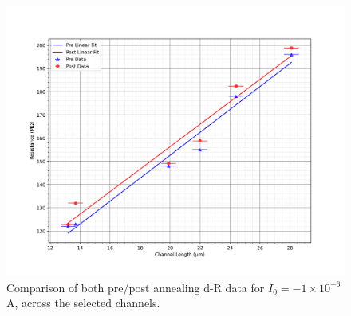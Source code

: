 \begin{refsection}
\begin{figure}[h]
    \centering
    \includegraphics[width=\textwidth]{Chapter3/Figs/Raster/Sample F 2022/Comparison/1e-06A.png}
    \caption{Comparison of both pre/post annealing d-R data for $I_{0}=-1\times10^{-6}$ \si{\ampere}, across the selected channels.}
    \label{fig:comparison-dr-1e-6}
\end{figure}


\end{refsection}
